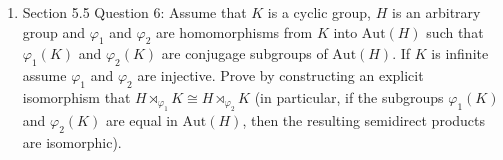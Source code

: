 \documentclass{article}
\begin{document}
\begin{enumerate}[label={\bf Q\arabic*:}]
\begin{proof}
      From the solution to the previous question 5.4.10, we showed that
      $G=P_1\ldots P_n$, where $P_1,\ldots,P_n$ are the Sylow subgroups of
      $G$. We prove the claim by induction on $n$. The case $n=1$ is
      trivially true. For $n+1$, we have 
      \begin{align*}
        \text{Aut}(G) &\cong \text{Aut}(P_1\ldots
          P_n)\times\text{Aut}(P_{n+1}) & (\text{by earlier assertion}) \\
                      &\cong
                      \text{Aut}(P_1)\times\ldots\times\text{Aut}(P_n)
          \times\text{Aut}(P_{n+1}). & (\text{by induction hypothesis}) \\
      \end{align*}
    \end{proof}

  \item Section 5.5 Question 6: Assume that $K$ is a cyclic group, $H$ is
    an arbitrary group and $\varphi_1$ and $\varphi_2$ are homomorphisms
    from $K$ into $\text{Aut}(H)$ such that  $\varphi_1(K)$ and
    $\varphi_2(K)$ are conjugage subgroups of $\text{Aut}(H)$. If $K$ is
    infinite assume $\varphi_1$ and $\varphi_2$ are injective. Prove by
    constructing an explicit isomorphism that $H\rtimes_{\varphi_1}K\cong
    H\rtimes_{\varphi_2}K$ (in particular, if the subgroups $\varphi_1(K)$
    and $\varphi_2(K)$ are equal in $\text{Aut}(H)$, then the resulting
    semidirect products are isomorphic).


\end{enumerate}
\end{document}
